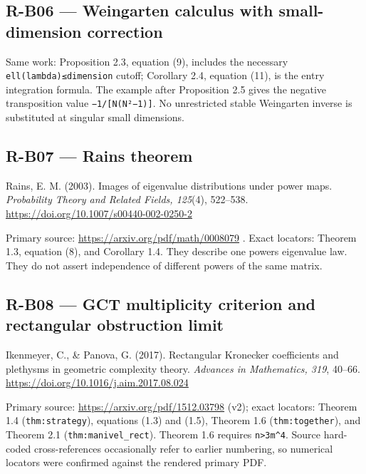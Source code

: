 \documentclass[11pt,a4paper]{article}
\theoremstyle{definition}\newtheorem{definition}{Definition}
\begin{document}
\subsection{R-B06 --- Weingarten calculus with small-dimension
correction}\label{r-b06--weingarten-calculus-with-small-dimension-correction}

Same work: Proposition 2.3, equation (9), includes the necessary
\nolinkurl{ell(lambda)≤dimension} cutoff; Corollary 2.4, equation (11), is
the entry integration formula. The example after Proposition 2.5 gives
the negative transposition value \texttt{−1/{[}N(N²−1){]}}. No
unrestricted stable Weingarten inverse is substituted at singular small
dimensions.

\subsection{R-B07 --- Rains theorem}\label{r-b07--rains-theorem}

Rains, E. M. (2003). Images of eigenvalue distributions under power
maps. \emph{Probability Theory and Related Fields, 125}(4), 522--538.
\url{https://doi.org/10.1007/s00440-002-0250-2}

Primary source: \url{https://arxiv.org/pdf/math/0008079} . Exact
locators: Theorem 1.3, equation (8), and Corollary 1.4. They describe
one power\textquotesingle s eigenvalue law. They do not assert
independence of different powers of the same matrix.

\subsection{R-B08 --- GCT multiplicity criterion and rectangular
obstruction
limit}\label{r-b08--gct-multiplicity-criterion-and-rectangular-obstruction-limit}

Ikenmeyer, C., \& Panova, G. (2017). Rectangular Kronecker coefficients
and plethysms in geometric complexity theory. \emph{Advances in
Mathematics, 319}, 40--66.
\url{https://doi.org/10.1016/j.aim.2017.08.024}

Primary source: \url{https://arxiv.org/pdf/1512.03798} (v2); exact
locators: Theorem 1.4 (\nolinkurl{thm:strategy}), equations (1.3) and
(1.5), Theorem 1.6 (\nolinkurl{thm:together}), and Theorem 2.1
(\nolinkurl{thm:manivel_rect}). Theorem 1.6 requires
\texttt{n\textgreater{}3m\^{}4}. Source hard-coded cross-references
occasionally refer to earlier numbering, so numerical locators were
confirmed against the rendered primary PDF.
\end{document}
